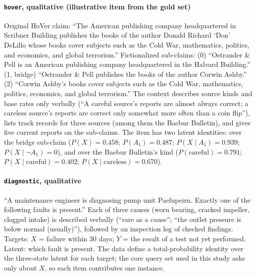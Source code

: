 \documentclass[11pt]{article}
\begin{document}
\paragraph{\texttt{hover}, qualitative (illustrative item from the gold set)} Original HoVer claim: ``The American publishing company headquartered in Scribner Building publishes the books of the author Donald Richard `Don' DeLillo whose books cover subjects such as the Cold War, mathematics, politics, and economics, and global terrorism.'' Fictionalized sub-claims: (0) ``Ostrander \& Pell is an American publishing company headquartered in the Halvard Building.'' (1, bridge) ``Ostrander \& Pell publishes the books of the author Corwin Ashby.'' (2) ``Corwin Ashby's books cover subjects such as the Cold War, mathematics, politics, economics, and global terrorism.'' The context describes source kinds and base rates only verbally (``A careful source's reports are almost always correct; a careless source's reports are correct only somewhat more often than a coin flip''), lists track records for three sources (among them the Baebur Bulletin), and gives five current reports on the sub-claims. The item has two latent identities: over the bridge sub-claim ($P(X)=0.458$; $P(A_1)=0.487$; $P(X\mid A_1)=0.939$; $P(X\mid\lnot A_1)=0$), and over the Baebur Bulletin's kind ($P(\text{careful})=0.791$; $P(X\mid\text{careful})=0.402$; $P(X\mid\text{careless})=0.670$).

\paragraph{\texttt{diagnostic}, qualitative} ``A maintenance engineer is diagnosing pump unit Paefupeirn. Exactly one of the following faults is present.'' Each of three causes (worn bearing, cracked impeller, clogged intake) is described verbally (``rare as a cause''; ``the outlet pressure is below normal (usually)''), followed by an inspection log of checked findings. Targets: $X$ = failure within 30 days; $Y$ = the result of a test not yet performed. Latent: which fault is present. The data define a total-probability identity over the three-state latent for each target; the core query set used in this study asks only about $X$, so each item contributes one instance.
\end{document}
